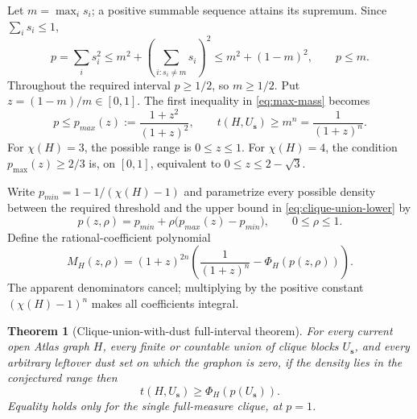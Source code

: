\documentclass[11pt]{article}
\newtheorem{theorem}{Theorem}[section]
\begin{document}
Let $m=\max_i s_i$; a positive summable sequence attains its supremum.
Since $\sum_i s_i\leq1$,
\begin{equation}
 p=\sum_i s_i^2
 \leq m^2+\left(\sum_{i:s_i\ne m}s_i\right)^2
 \leq m^2+(1-m)^2,
 \qquad p\leq m.
 \label{eq:max-mass}
\end{equation}
Throughout the required interval $p\geq1/2$, so $m\geq1/2$.  Put
$z=(1-m)/m\in[0,1]$.  The first inequality in \eqref{eq:max-mass} becomes
\[
 p\leq p_{max}(z):=\frac{1+z^2}{(1+z)^2},
 \qquad
 t(H,U_{\boldsymbol s})\geq m^n=\frac1{(1+z)^n}.
 \label{eq:clique-union-lower}
\]
For $\chi(H)=3$, the possible range is $0\leq z\leq1$.  For $\chi(H)=4$,
the condition $p_{\max}(z)\geq2/3$ is, on $[0,1]$, equivalent to
$0\leq z\leq2-\sqrt3$.

Write $p_{min}=1-1/(\chi(H)-1)$ and parametrize every possible density
between the required threshold and the upper bound in
\eqref{eq:clique-union-lower} by
\begin{equation}
 p(z,\rho)=p_{min}+\rho\bigl(p_{max}(z)-p_{min}\bigr),
 \qquad0\leq\rho\leq1.
 \label{eq:clique-density-parameter}
\end{equation}
Define the rational-coefficient polynomial
\begin{equation}
 M_H(z,\rho)=(1+z)^{2n}
 \left(\frac1{(1+z)^n}-\Phi_H(p(z,\rho))\right).
 \label{eq:clique-union-polynomial}
\end{equation}
The apparent denominators cancel; multiplying by the positive constant
$(\chi(H)-1)^n$ makes all coefficients integral.

\begin{theorem}[Clique-union-with-dust full-interval theorem]
\label{thm:clique-union}
For every current open Atlas graph $H$, every finite or countable union of
clique blocks $U_{\boldsymbol s}$, and every arbitrary leftover dust set on
which the graphon is zero, if the density lies in the conjectured range then
\[
 t(H,U_{\boldsymbol s})\geq
 \Phi_H(p(U_{\boldsymbol s})).
\]
Equality holds only for the single full-measure clique, at $p=1$.
\end{theorem}
\end{document}
